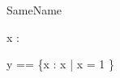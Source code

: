 \begin{zsection}
  \SECTION SameName
\end{zsection}

\begin{axdef}
  x : \power\arithmos
\end{axdef}

\begin{axdef}
  y == \{x : x | x = 1 \}
\end{axdef}
